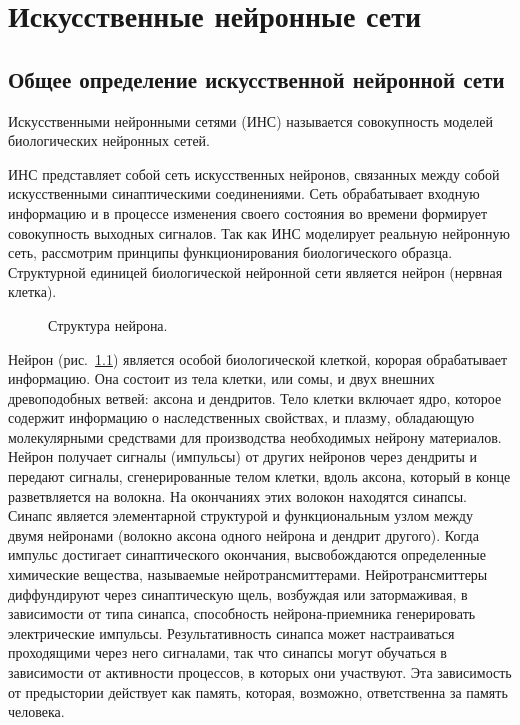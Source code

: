 \chapter{Искусственные нейронные сети}
\section{Общее определение искусственной нейронной сети}
\begin{Def}
Искусственными нейронными сетями (ИНС) называется совокупность моделей биологических нейронных сетей.
\end{Def}
ИНС представляет собой сеть искусственных нейронов, связанных между собой искусственными синаптическими соединениями.
Сеть обрабатывает входную информацию и в процессе изменения своего состояния во времени формирует совокупность выходных сигналов.\cite{COURSE}
Так как ИНС моделирует реальную нейронную сеть, рассмотрим принципы функционирования биологического образца.
Структурной единицей биологической нейронной сети является нейрон (нервная клетка).
\begin{figure}[h]
\caption{Структура нейрона.}
\label{ris:neuron}
\end{figure}
Нейрон (рис.~\ref{ris:neuron}) является особой биологической клеткой, корорая обрабатывает информацию.
Она состоит из тела клетки, или сомы, и двух внешних древоподобных ветвей: аксона и дендритов.
Тело клетки включает ядро, которое содержит информацию о наследственных свойствах, и плазму, обладающую молекулярными средствами для производства необходимых нейрону материалов.
Нейрон получает сигналы (импульсы) от других нейронов через дендриты и передают сигналы, сгенерированные телом клетки, вдоль аксона, который в конце разветвляется на волокна.
На окончаниях этих волокон находятся синапсы. 
Синапс является элементарной структурой и функциональным узлом между двумя нейронами (волокно аксона одного нейрона и дендрит другого).
Когда импульс достигает синаптического окончания, высвобождаются определенные химические вещества, называемые нейротрансмиттерами.
Нейротрансмиттеры диффундируют через синаптическую щель, возбуждая или затормаживая, в зависимости от типа синапса, способность нейрона-приемника генерировать электрические импульсы.
Результативность синапса может настраиваться проходящими через него сигналами, так что синапсы могут обучаться в зависимости от активности процессов, в которых они участвуют.
Эта зависимость от предыстории действует как память, которая, возможно, ответственна за память человека.
\cite{nn_int_jain}
